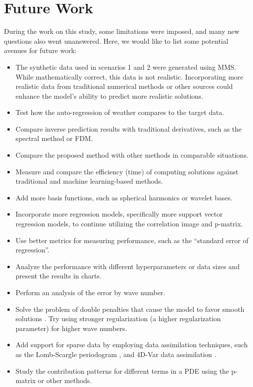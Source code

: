 \section{Future Work}
During the work on this study, some limitations were imposed, and many new questions also went unanswered. Here, we would like to list some potential avenues for future work:
\begin{itemize}
    \item The synthetic data used in scenarios 1 and 2 were generated using MMS\@. While mathematically correct, this data is not realistic. Incorporating more realistic data from traditional numerical methods or other sources could enhance the model's ability to predict more realistic solutions.
    \item Test how the auto-regression of weather compares to the target data.
    \item Compare inverse prediction results with traditional derivatives, such as the spectral method or FDM\@.
    \item Compare the proposed method with other methods in comparable situations.
    \item Measure and compare the efficiency (time) of computing solutions against traditional and machine learning-based methods.
    \item Add more basis functions, such as spherical harmonics or wavelet bases.
    \item Incorporate more regression models, specifically more support vector regression models, to continue utilizing the correlation image and p-matrix.
    \item Use better metrics for measuring performance, such as the \enquote{standard error of regression}.
    \item Analyze the performance with different hyperparameters or data sizes and present the results in charts.
    \item Perform an analysis of the error by wave number.
    \item Solve the problem of double penalties that cause the model to favor smooth solutions \autocite{brownForecastsSpatialFields2011,NIPS2017_44a2e080}. Try using stronger regularization (a higher regularization parameter) for higher wave numbers.
    \item Add support for sparse data by employing data assimilation techniques, such as the Lomb-Scargle periodogram \autocite{vanderplasUnderstandingLombScargle2018}, and 4D-Var data assimilation \autocite{puNumericalWeatherPrediction2018,parkDataAssimilationAtmospheric2013}.
    \item Study the contribution patterns for different terms in a PDE using the p-matrix or other methods.
\end{itemize}
